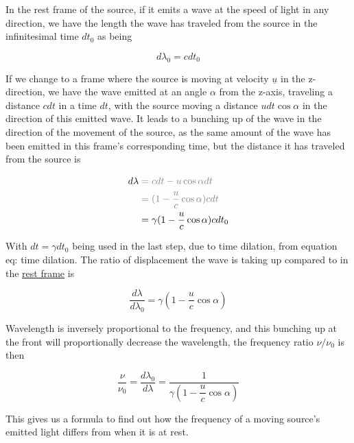 In the rest frame of the source, if it emits a wave at the speed of light in any direction, we have the length the wave has traveled from the source in the infinitesimal time ${dt_0}$ as being

\begin{equation}
	{d\lambda_0} = {c}{dt_0}
\end{equation}

If we change to a frame where the source is moving at velocity ${\underline{u}}$ in the z-direction, we have the wave emitted at an angle $\alpha$ from the z-axis, traveling a distance ${c}{dt}$ in a time ${dt}$, with the source moving a distance $ u {dt} \cos\alpha $ in the direction of this emitted wave.
It leads to a bunching up of the wave in the direction of the movement of the source, as the same amount of the wave has been emitted in this frame's corresponding time, but the distance it has traveled from the source is

\begin{equation}
	\begin{aligned}
		{d\lambda} & \color{gray}= {c}{dt}-{u} \cos\alpha {dt}   \\
		           & \color{gray}=  (1-\frac{u}{c}\cos\alpha)cdt \\
		           & = {\gamma} (1-\frac{u}{c}\cos\alpha)cdt_0   \\
	\end{aligned}
\end{equation}

With ${dt} = {\gamma} {dt_0}$ being used in the last step, due to time dilation, from equation {eq: time dilation}.
The ratio of displacement the wave is taking up compared to in the \hyperlink{def-proper-frame}{rest frame} is

\begin{equation}
	\frac{d\lambda}{d\lambda_0} = {\gamma} \left(1-\dfrac{u}{c} \cos\alpha \right)
\end{equation}

Wavelength is inversely proportional to the frequency, and this bunching up at the front will proportionally decrease the wavelength, the frequency ratio $\nu/\nu_0$ is then

\begin{equation}
	\label{eq: Doppler Effect}
	\frac{\nu}{\nu_0} = \frac{d\lambda_0}{d\lambda} = \frac{1}{ {\gamma} \left(1-\dfrac{u}{c} \cos\alpha \right)}
\end{equation}

This gives us a formula to find out how the frequency of a moving source's emitted light differs from when it is at rest.

